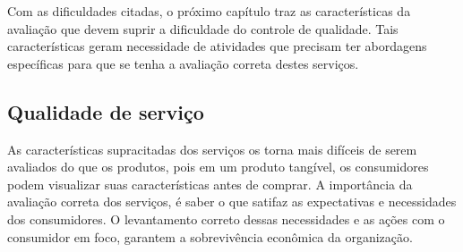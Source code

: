 Com as dificuldades citadas, o próximo capítulo traz as características da avaliação que devem suprir a dificuldade do controle de qualidade. Tais características geram necessidade de atividades que precisam ter abordagens específicas para que se tenha a avaliação correta destes serviços. 

\subsection{Qualidade de serviço}

As características supracitadas dos serviços os torna mais difíceis de serem avaliados do que os produtos, pois em um produto tangível, os consumidores podem visualizar suas características antes de comprar. A importância da avaliação correta dos serviços, é saber o que satifaz as expectativas e necessidades dos consumidores. O levantamento correto dessas necessidades e as ações com o consumidor em foco, garantem a sobrevivência econômica da organização. \cite{zeithaml1981} 

